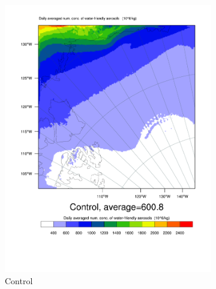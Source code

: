 \begin{figure}[hb]
\centering
	\begin{subfigure}{0.48\textwidth}
		\centering
		\includegraphics[width=\textwidth]{results/Aero10/Control_QNWFA_Day1.pdf}
		\caption{Control}
		\label{subfig:qnwfa_r1}
	\end{subfigure}
	\begin{subfigure}{0.48\textwidth}
		\centering

\end{subfigure}
\end{figure}
